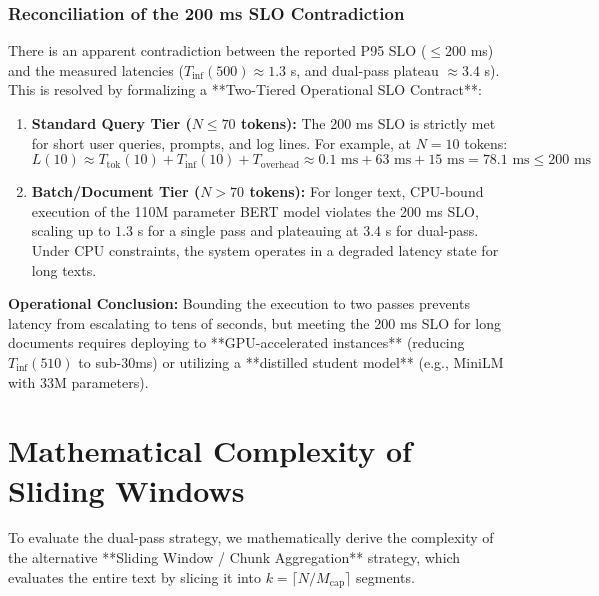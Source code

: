 \documentclass[10pt]{article}
\begin{document}
\subsubsection{Reconciliation of the 200 ms SLO Contradiction}
\label{subsec:slo_reconciliation}
There is an apparent contradiction between the reported P95 SLO ($\le 200$ ms) and the measured latencies ($T_{\text{inf}}(500) \approx 1.3$ s, and dual-pass plateau $\approx 3.4$ s). This is resolved by formalizing a **Two-Tiered Operational SLO Contract**:
\begin{enumerate}
\item \textbf{Standard Query Tier ($N \le 70$ tokens):} The 200 ms SLO is strictly met for short user queries, prompts, and log lines. For example, at $N = 10$ tokens:
  \begin{equation}
  L(10) \approx T_{\text{tok}}(10) + T_{\text{inf}}(10) + T_{\text{overhead}} \approx 0.1\text{ ms} + 63\text{ ms} + 15\text{ ms} = 78.1\text{ ms} \le 200\text{ ms}
  \end{equation}
\item \textbf{Batch/Document Tier ($N > 70$ tokens):} For longer text, CPU-bound execution of the 110M parameter BERT model violates the 200 ms SLO, scaling up to $1.3$ s for a single pass and plateauing at $3.4$ s for dual-pass. Under CPU constraints, the system operates in a degraded latency state for long texts. 
\end{enumerate}
\textbf{Operational Conclusion:} Bounding the execution to two passes prevents latency from escalating to tens of seconds, but meeting the 200 ms SLO for long documents requires deploying to **GPU-accelerated instances** (reducing $T_{\text{inf}}(510)$ to sub-30ms) or utilizing a **distilled student model** (e.g., MiniLM with 33M parameters).

\section{Mathematical Complexity of Sliding Windows}
To evaluate the dual-pass strategy, we mathematically derive the complexity of the alternative **Sliding Window / Chunk Aggregation** strategy, which evaluates the entire text by slicing it into $k = \lceil N / M_{\text{cap}} \rceil$ segments.
\end{document}
